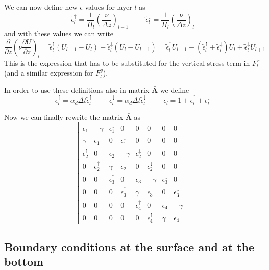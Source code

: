 \documentclass[12pt,draft]{article}
\newcommand{\Amat}{\mathbf{\bar{A}}}
\newcommand{\dt}{\Delta t}
\newcommand{\dz}{\Delta z}
\newcommand{\dpartz}[1]{\frac{\partial #1}{\partial z}}
\begin{document}
\newcommand{\EUT}[1]{\tilde{\epsilon}^\uparrow_#1}
\newcommand{\EDT}[1]{\tilde{\epsilon}^\downarrow_#1}
\newcommand{\EU}[1]{\epsilon^\uparrow_#1}
\newcommand{\ED}[1]{\epsilon^\downarrow_#1}
\newcommand{\EC}[1]{\epsilon_#1}

We can now define new $\epsilon$ values for layer $l$ as
\begin{equation}
\EUT{l} = \frac{1}{H_l}
		\left( \frac{\nu}{\dz} \right)_{l-1}
	\hspace{1cm}
\EDT{l}  = \frac{1}{H_l}
		\left( \frac{\nu}{\dz} \right)_{l}
\end{equation}
and with these values we can write
\begin{equation}
\dpartz{} \left( \nu\dpartz{U} \right)_l =
\EUT{l}(U_{l-1}-U_l) - \EDT{l}(U_l-U_{l+1}) =
\EUT{l}U_{l-1} - (\EUT{l}+ \EDT{l})U_l + \EDT{l}U_{l+1}
\end{equation}
This is the expression that has to be substituted for the vertical
stress term in $F^x_l$ (and a similar expression for $F^y_l$).

In order to use these definitions also in matrix $\Amat$ we
define
\begin{equation}
\EU{l} = \alpha_d\dt\EUT{l}
	\hspace{1cm}
\ED{l} = \alpha_d\dt\EDT{l}
	\hspace{1cm}
\EC{l} =  1 + \EU{l} + \ED{l}
\end{equation}


Now we can finally rewrite the matrix $\Amat$ as
{
\newcommand{\GG}{\gamma}
\begin{equation}
\begin{bmatrix}
\EC{1}  & -\GG & \ED{1} & 0      & 0    & 0 & 0 & 0 \\
\GG & \EC{1}   & 0    & \ED{1}   & 0    & 0 & 0 & 0 \\
\EU{2}  & 0      & \EC{2} & -\GG & \ED{2} & 0 & 0 & 0\\
0     & \EU{2}   & \GG & \EC{2}  & 0    & \ED{2}   & 0 & 0 \\
0 & 0 & \EU{3}  & 0      & \EC{3} & -\GG & \ED{3} & 0 \\
0 & 0 & 0     & \EU{3}   & \GG & \EC{3}  & 0    & \ED{3} \\
0 & 0 & 0 & 0 & \EU{4}  & 0      & \EC{4} & -\GG \\
0 & 0 & 0 & 0 & 0     & \EU{4}   & \GG & \EC{4}      
\end{bmatrix}
\end{equation}
}

\subsection{Boundary conditions at the surface and at
the bottom}
\end{document}
